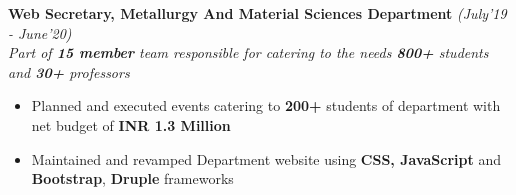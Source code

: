 \documentclass[10.5pt]{article}
\begin{document}
	\vspace{0pt}
	\hspace{-17 pt}
	\textbf{Web Secretary, Metallurgy And Material Sciences Department}  \hfill{\sl \small (July'19 - June'20)}  \\
\textit{Part of \textbf{15 member} team responsible for  catering to the needs \textbf{800+} students and \textbf{30+} professors }\\
\vspace{-19pt}
	\begin{itemize}[itemsep = -1.5 mm, leftmargin=*]
        \item Planned and executed events catering to \textbf{200+} students of department with net budget of \textbf{INR 1.3 Million}
        
        \item Maintained and revamped Department website using \textbf{CSS, JavaScript} and \textbf{Bootstrap},  \textbf{Druple} frameworks
        
        
        
	\end{itemize}

\end{document}
